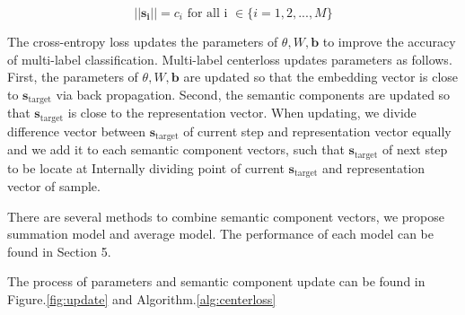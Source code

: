 \[
||\mathbf{s_i}|| = c_i \text{ for all i }\in \{i = 1,2, ..., M\}
\]

The cross-entropy loss updates the parameters of $ \theta, W, \mathbf{b} $ to improve the accuracy of multi-label classification. Multi-label centerloss updates parameters as follows. First, the parameters of $\theta, W, \mathbf{b} $ are updated so that the embedding vector is close to $\mathbf{s}_{\text{target}} $ via back propagation. Second, the semantic components are updated so that $ \mathbf{s}_{\text{target}} $ is close to the representation vector. When updating, we divide difference vector between $\mathbf{s}_{\text{target}}$ of current step and representation vector equally and we add it to each semantic component vectors, such that $\mathbf{s}_{\text{target}}$ of next step to be locate at Internally dividing point of current $\mathbf{s}_{\text{target}}$ and representation vector of sample. 

There are several methods to combine semantic component vectors, we propose summation model and average model. The performance of each model can be found in Section 5.

The process of parameters and semantic component update can be found in Figure.\ref{fig:update} and Algorithm.\ref{alg:centerloss}


